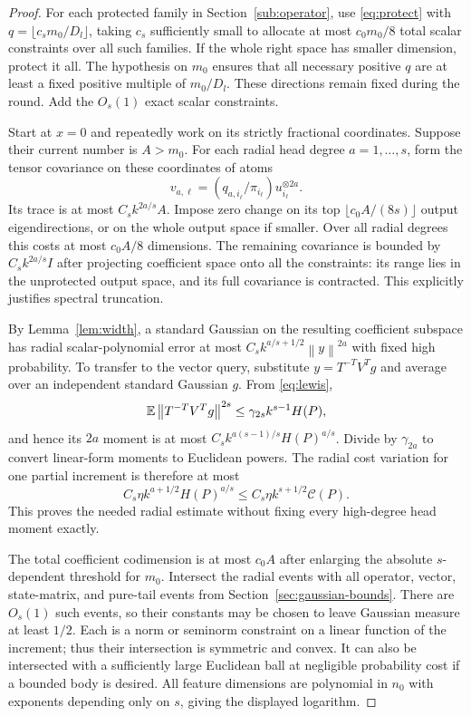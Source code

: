 \documentclass[11pt]{article}
\theoremstyle{remark}\newtheorem{remark}[theorem]{Remark}
\newcommand{\norm}[1]{\left\|#1\right\|}\newcommand{\ip}[2]{\left\langle #1,#2\right\rangle}
\newcommand{\cost}{\mathcal C}\newcommand{\OPT}{\mathsf{OPT}}
\begin{document}
\begin{proof}
For each protected family in Section~\ref{sub:operator}, use \eqref{eq:protect} with $q=\lfloor c_s m_0/D_l\rfloor$, taking $c_s$ sufficiently small to allocate at most $c_0m_0/8$ total scalar constraints over all such families. If the whole right space has smaller dimension, protect it all. The hypothesis on $m_0$ ensures that all necessary positive $q$ are at least a fixed positive multiple of $m_0/D_l$. These directions remain fixed during the round. Add the $O_s(1)$ exact scalar constraints.

Start at $x=0$ and repeatedly work on its strictly fractional coordinates. Suppose their current number is $A>m_0$. For each radial head degree $a=1,\ldots,s$, form the tensor covariance on these coordinates of atoms
\[
 v_{a,\ell}=(q_{a,i_\ell}/\pi_{i_\ell})u_{i_\ell}^{\otimes2a}.
\]
Its trace is at most $C_s k^{2a/s}A$. Impose zero change on its top $\lfloor c_0 A/(8s)\rfloor$ output eigendirections, or on the whole output space if smaller. Over all radial degrees this costs at most $c_0A/8$ dimensions. The remaining covariance is bounded by $C_s k^{2a/s}I$ after projecting coefficient space onto all the constraints: its range lies in the unprotected output space, and its full covariance is contracted. This explicitly justifies spectral truncation.

By Lemma~\ref{lem:width}, a standard Gaussian on the resulting coefficient subspace has radial scalar-polynomial error at most $C_s k^{a/s+1/2}\norm y^{2a}$ with fixed high probability. To transfer to the vector query, substitute $y=T^{-T}V^Tg$ and average over an independent standard Gaussian $g$. From \eqref{eq:lewis},
\[
 \E\norm{T^{-T}V^Tg}^{2s}\le\gamma_{2s}k^{s-1}H(P),
\]
and hence its $2a$ moment is at most $C_s k^{a(s-1)/s}H(P)^{a/s}$. Divide by $\gamma_{2a}$ to convert linear-form moments to Euclidean powers. The radial cost variation for one partial increment is therefore at most
\[
 C_s\eta k^{a+1/2}H(P)^{a/s}\le C_s\eta k^{s+1/2}\cost(P).
\]
This proves the needed radial estimate without fixing every high-degree head moment exactly.

The total coefficient codimension is at most $c_0A$ after enlarging the absolute $s$-dependent threshold for $m_0$. Intersect the radial events with all operator, vector, state-matrix, and pure-tail events from Section~\ref{sec:gaussian-bounds}. There are $O_s(1)$ such events, so their constants may be chosen to leave Gaussian measure at least $1/2$. Each is a norm or seminorm constraint on a linear function of the increment; thus their intersection is symmetric and convex. It can also be intersected with a sufficiently large Euclidean ball at negligible probability cost if a bounded body is desired. All feature dimensions are polynomial in $n_0$ with exponents depending only on $s$, giving the displayed logarithm.


\end{proof}
\end{document}
